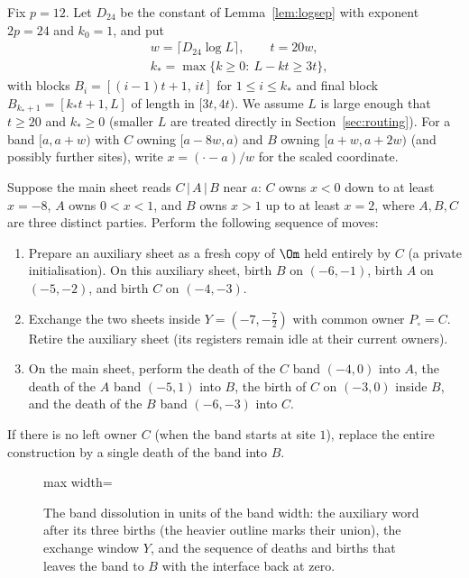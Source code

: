 \precisely
Fix $p=12$. Let $D_{24}$ be the constant of Lemma~\ref{lem:logsep} with
exponent $2p=24$ and $k_0=1$, and put
\begin{equation}\label{eq:blocks}
\begin{split}
 &w=\lceil D_{24}\log L\rceil,\qquad t=20w,\\
 &k_*=\max\{k\ge0:\ L-kt\ge 3t\},
\end{split}
\end{equation}
with blocks $B_i=[(i-1)t+1,\,it]$ for $1\le i\le k_*$ and final block
$B_{k_*+1}=[k_*t+1,L]$ of length in $[3t,4t)$. We assume $L$ is large enough
that $t\ge 20$ and $k_*\ge0$ (smaller $L$ are treated directly in Section~\ref{sec:routing}).
For a band $[a,a+w)$ with $C$ owning $[a-8w,a)$ and $B$ owning
$[a+w,a+2w)$ (and possibly further sites), write $x=(\cdot-a)/w$ for the scaled
coordinate.

\begin{construction}\label{con:band}
Suppose the main sheet reads $C\,|\,A\,|\,B$ near $a$: $C$ owns $x<0$ down to at
least $x=-8$, $A$ owns $0<x<1$, and $B$ owns $x>1$ up to at least $x=2$, where
$A,B,C$ are three distinct parties. Perform the following sequence of moves:
\begin{enumerate}[leftmargin=2em]
\item[(i)] Prepare an auxiliary sheet as a fresh copy of $\Om$ held entirely
by $C$ (a private initialisation). On this auxiliary sheet, birth $B$ on $(-6,-1)$, birth $A$ on
$(-5,-2)$, and birth $C$ on $(-4,-3)$.
\item[(ii)] Exchange the two sheets inside $Y=(-7,-\tfrac72)$ with common owner
$P_\circ=C$. Retire the auxiliary sheet (its registers remain idle at their current
owners).
\item[(iii)] On the main sheet, perform the death of the $C$ band $(-4,0)$ into $A$,
the death of the $A$ band $(-5,1)$ into $B$, the birth of $C$ on $(-3,0)$ inside
$B$, and the death of the $B$ band $(-6,-3)$ into $C$.
\end{enumerate}
If there is no left owner $C$ (when the band starts at site $1$), replace
the entire construction by a single death of the band into $B$.
\end{construction}

\begin{figure}[t]
\centering
\begin{adjustbox}{max width=\linewidth}

\end{adjustbox}
\caption{The band dissolution in units of the band width: the auxiliary word after its three births (the heavier outline marks their union), the exchange window $Y$, and the sequence of deaths and births that leaves the band to $B$ with the interface back at zero.}\label{fig:band-words}
\end{figure}

